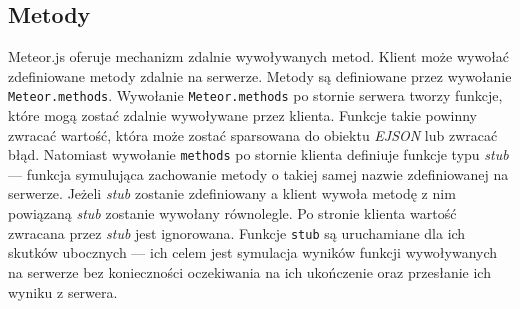 \subsection{Metody}
Meteor.js oferuje mechanizm zdalnie wywoływanych metod. Klient może wywołać zdefiniowane metody zdalnie na serwerze. Metody są definiowane przez wywołanie \linebreak \verb|Meteor.methods|. Wywołanie \verb|Meteor.methods| po stornie serwera tworzy funkcje, które mogą zostać zdalnie wywoływane przez klienta. Funkcje takie powinny zwracać wartość, która może zostać sparsowana do obiektu \textit{EJSON} lub zwracać błąd. Natomiast wywołanie \verb|methods| po stornie klienta definiuje funkcje typu \textit{stub} --- funkcja symulująca zachowanie metody o takiej samej nazwie  zdefiniowanej na serwerze. Jeżeli \textit{stub} zostanie zdefiniowany a klient wywoła metodę z nim powiązaną \textit{stub} zostanie wywołany równolegle. Po stronie klienta wartość zwracana przez \textit{stub} jest ignorowana. Funkcje \verb|stub| są uruchamiane dla ich skutków ubocznych --- ich celem jest symulacja wyników funkcji wywoływanych na serwerze bez konieczności oczekiwania na ich ukończenie oraz przesłanie ich wyniku z serwera.

